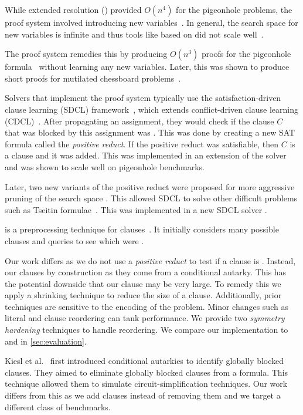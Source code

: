 

 While extended resolution (\er) provided $O(n^4)$ for the pigeonhole problems,
 the proof system involved introducing new variables~\cite{er}. In general, the
 search space for new variables is infinite and thus tools like \glucoser based
 on \er did not scale well~\cite{glucoser}.

The \pr proof system remedies this by producing $O(n^3)$ proofs for the
pigeonhole formula~\cite{prclauses} without learning any new variables. Later,
this was shown to produce short proofs for mutilated chessboard
problems~\cite{mutilatedchessboard-pr}. 

Solvers that implement the \pr proof system typically use the
satisfaction-driven clause learning (SDCL) framework~\cite{sdcl}, which extends
conflict-driven clause learning (CDCL)~\cite{cdcl}. 
After propagating an assignment, they would check if the clause $C$ that was
blocked by this assignment was \pr. This was done by creating a new SAT formula
called the \emph{positive reduct}. If the positive reduct was satisfiable, then
$C$ is a \pr clause and it was added. This was implemented in an extension of
the solver \lingeling and was shown to scale well on pigeonhole benchmarks.

Later, two new variants of the positive reduct were proposed for more aggressive
pruning of the search space \cite{sadical}. This allowed SDCL to solve other
difficult problems such as Tseitin formulae~\cite{hardexamplesresolution}. This
was implemented in a new SDCL solver \sadical.


\prelearn is a preprocessing technique for \pr clauses~\cite{prelearn}. It
initially considers many possible clauses and queries \sadical to see which were
\pr.

Our work differs as we do not use a \emph{positive reduct} to test if a clause
is \pr. Instead, our clauses \pr by construction as they come from a conditional
autarky. This has the potential downside that our clause may be very large. To
remedy this we apply a shrinking technique to reduce the size of a clause.
Additionally, prior techniques are sensitive to the encoding of the problem.
Minor changes such as literal and clause reordering can tank performance. We
provide two \emph{symmetry hardening} techniques to handle reordering. We
compare our implementation \tool to \sadical and \prelearn in
\autoref{sec:evaluation}.

Kiesl et al.~\cite{conditionalautarkies} first introduced conditional autarkies
to identify globally blocked clauses. They aimed to eliminate globally blocked
clauses from a formula. This technique allowed them to simulate
circuit-simplification techniques. Our work differs from this as we add clauses
instead of removing them and we target a different class of benchmarks.
